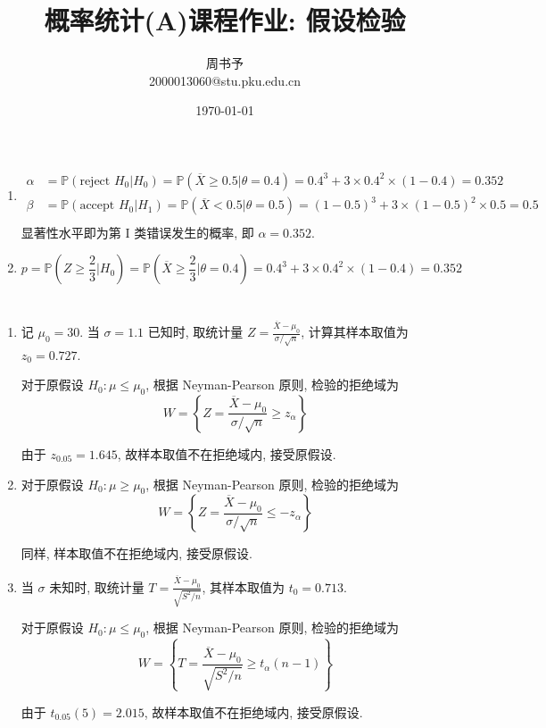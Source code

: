 \documentclass[8pt]{article}
\title{\heiti\zihao{2} 概率统计(A)课程作业: 假设检验}
\author{\kaishu\zihao{-3} 周书予\\2000013060@stu.pku.edu.cn}
\date{\today}
\theoremstyle{compact}
\def\le{\leqslant}
\def\ge{\geqslant}
\def\P#1{\mathbb{P}\left({#1}\right)}
\begin{document}
\pagestyle{plain}

\maketitle

\section{}
\begin{enumerate}
	\item \begin{align*}
		\alpha &= \P{\text{reject }H_0 | H_0} = \P{\overline{X} \ge 0.5 | \theta = 0.4} = 0.4^3 + 3 \times 0.4^2 \times (1 - 0.4) = 0.352 \\
		\beta &= \P{\text{accept }H_0 | H_1} = \P{\overline{X} < 0.5 | \theta = 0.5} = (1 - 0.5)^3 + 3 \times (1 - 0.5)^2 \times 0.5 = 0.5 \\
	\end{align*}
	显著性水平即为第 I 类错误发生的概率, 即 $\alpha = 0.352$.
	\item $$p = \P{Z \ge \frac23 | H_0} = \P{\overline{X} \ge \frac23 | \theta = 0.4} = 0.4^3 + 3 \times 0.4^2 \times (1 - 0.4) = 0.352$$
\end{enumerate}

\section{}
\begin{enumerate}
	\item 记 $\mu_0 = 30$. 当 $\sigma = 1.1$ 已知时, 取统计量 $Z = \frac{\overline{X} - \mu_0}{\sigma / \sqrt n}$, 计算其样本取值为 $z_0 = 0.727$.
	
	对于原假设 $H_0: \mu \le \mu_0$, 根据 Neyman-Pearson 原则, 检验的拒绝域为 $$W = \left\{Z = \frac{\overline{X} - \mu_0}{\sigma / \sqrt n} \ge z_{\alpha}\right\}$$

	由于 $z_{0.05} = 1.645$, 故样本取值不在拒绝域内, 接受原假设.

	\item 对于原假设 $H_0: \mu \ge \mu_0$, 根据 Neyman-Pearson 原则, 检验的拒绝域为 $$W = \left\{Z = \frac{\overline{X} - \mu_0}{\sigma / \sqrt n} \le -z_{\alpha}\right\}$$

	同样, 样本取值不在拒绝域内, 接受原假设.
	
	\item 当 $\sigma$ 未知时, 取统计量 $T = \frac{\overline{X} - \mu_0}{\sqrt{S^2 / n}}$, 其样本取值为 $t_0 = 0.713$.
 
	对于原假设 $H_0: \mu \le \mu_0$, 根据 Neyman-Pearson 原则, 检验的拒绝域为 $$W = \left\{T = \frac{\overline{X} - \mu_0}{\sqrt{S^2 / n}} \ge t_{\alpha}(n - 1)\right\}$$

	由于 $t_{0.05}(5) = 2.015$, 故样本取值不在拒绝域内, 接受原假设.
\end{enumerate}
\end{document}
